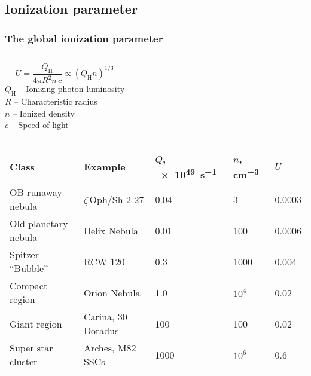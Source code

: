 \documentclass[presentation]{beamer}
\begin{document}
\subsection{Ionization parameter}
\begin{frame}
  \frametitle{The global ionization parameter}

  \begin{columns}
    \[
      U = \frac{Q_{\mathrm{H}}}{4 \pi R^2 n\, c } \propto (Q_{\mathrm{H}} n)^{1/3}
    \]
    \(Q_{\mathrm{H}}\) -- Ionizing photon luminosity\\
    \(R\) -- Characteristic radius\\
    \(n\) -- Ionized density\\
    \(c\) -- Speed of light
  \end{columns}
  
  \bigskip
  \renewcommand\arraystretch{1.1}
  \begin{tabular}{lllll}\toprule
    Class & Example & \(Q\), \SI{e49}{s^{-1}} & \(n\), \si{cm^{-3}} & \(U\)\\ \midrule
    OB runaway nebula & \(\zeta\)\,Oph/Sh 2-27 & 0.04 & 3 & 0.0003 \\
    Old planetary nebula & Helix Nebula & 0.01 & 100 & 0.0006 \\
    Spitzer ``Bubble'' & RCW 120 & 0.3 & 1000 & 0.004 \\
    Compact \hii{} region & Orion Nebula & 1.0 & \(10^4\) & 0.02 \\
    Giant \hii{} region & Carina, 30 Doradus &  100 & 100 & 0.02 \\ 
    Super star cluster & Arches, M82 SSCs & 1000 & \(10^6\) & 0.6 \\
    \bottomrule
  \end{tabular}

\end{frame}
\end{document}
